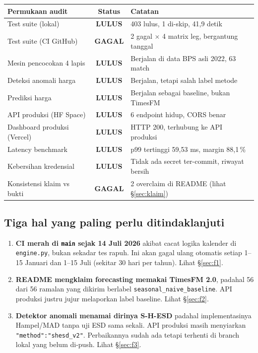 \documentclass[11pt,a4paper]{article}
\newcommand{\code}[1]{\texttt{\small #1}}
\newcommand{\ok}{\textcolor{okgreen}{\textbf{LULUS}}}
\newcommand{\gagal}{\textcolor{sevhigh}{\textbf{GAGAL}}}
\begin{document}
\begin{center}
\begin{tabular}{@{}p{5.4cm}cp{7.6cm}@{}}
\toprule
\textbf{Permukaan audit} & \textbf{Status} & \textbf{Catatan} \\
\midrule
Test suite (lokal) & \ok & 403 lulus, 1 di-skip, 41,9 detik \\
Test suite (CI GitHub) & \gagal & 2 gagal $\times$ 4 matrix leg, bergantung tanggal \\
Mesin pencocokan 4 lapis & \ok & Berjalan di data BPS asli 2022, 63 match \\
Deteksi anomali harga & \ok & Berjalan, tetapi salah label metode \\
Prediksi harga & \ok & Berjalan sebagai baseline, bukan TimesFM \\
API produksi (HF Space) & \ok & 6 endpoint hidup, CORS benar \\
Dashboard produksi (Vercel) & \ok & HTTP 200, terhubung ke API produksi \\
Latency benchmark & \ok & p99 tertinggi 59,53 ms, margin 88,1\,\% \\
Kebersihan kredensial & \ok & Tidak ada secret ter-commit, riwayat bersih \\
Konsistensi klaim vs bukti & \gagal & 2 overclaim di README (lihat \S\ref{sec:klaim}) \\
\bottomrule
\end{tabular}
\end{center}

\subsection{Tiga hal yang paling perlu ditindaklanjuti}

\begin{enumerate}
  \item \textbf{CI merah di \code{main} sejak 14 Juli 2026} akibat cacat logika kalender di
        \code{engine.py}, bukan sekadar tes rapuh. Ini akan gagal ulang otomatis setiap
        1--15 Januari dan 1--15 Juli (sekitar 30 hari per tahun). Lihat \S\ref{sec:f1}.
  \item \textbf{README mengklaim forecasting memakai TimesFM 2.0}, padahal 56 dari 56 ramalan
        yang dikirim berlabel \code{seasonal\_naive\_baseline}. API produksi justru jujur
        melaporkan label baseline. Lihat \S\ref{sec:f2}.
  \item \textbf{Detektor anomali menamai dirinya S-H-ESD} padahal implementasinya Hampel/MAD
        tanpa uji ESD sama sekali. API produksi masih menyiarkan \code{"method":"shesd\_v2"}.
        Perbaikannya sudah ada tetapi terhenti di branch lokal yang belum di-push.
        Lihat \S\ref{sec:f3}.
\end{enumerate}
\end{document}
